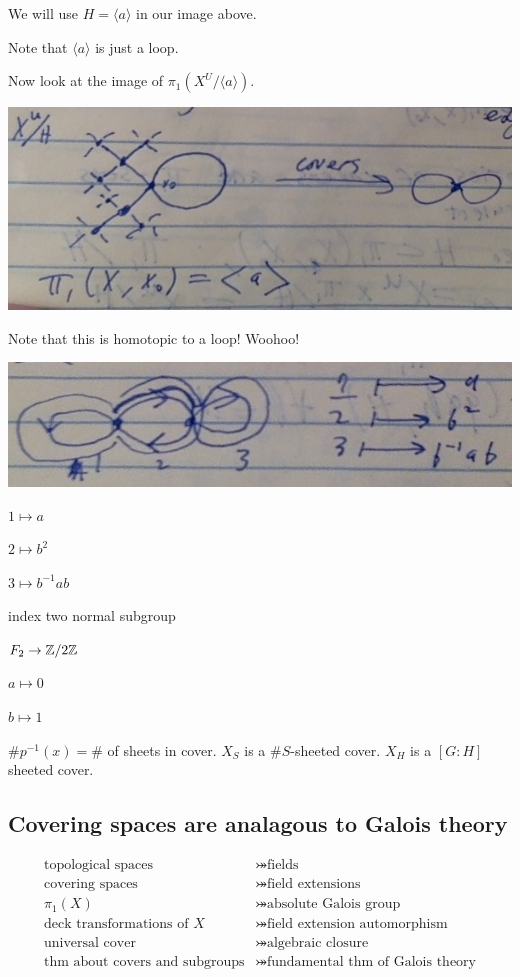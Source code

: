\documentclass[11pt,leqno,oneside]{amsart}
\numberwithin{thm}{section}
\newcommand{\fund}[1][1]{\pi_{#1}}
\begin{document}
\begin{example}
  We will use $H =  \langle a \rangle $ in our image above.

  Note that $ \langle a \rangle $ is just a loop.

  Now look at the image of $\fund(X^U/ \langle a \rangle )$.

  \includegraphics[scale=0.2]{images/loop-tree-cover}

  Note that this is homotopic to a loop!  Woohoo!
\end{example}
\begin{example}
  \includegraphics[scale=0.26]{images/loopy}

  $1 \mapsto a$

  $2 \mapsto b^2$

  $3 \mapsto b^{-1} a b$

  index two normal subgroup

  $F_2 \to {\mathbb Z}/2{\mathbb Z}$

  $a \mapsto 0$

  $b \mapsto 1$
\end{example}


$\#p^{-1}(x) = \#$ of sheets in cover.  $X_S$ is a $\#S$-sheeted cover.  $X_H$ is a $[G:H]$ sheeted cover.

\subsection{Covering spaces are analagous to Galois theory}
\begin{align}
  \text{topological spaces} &\bij \text{fields} \\
  \text{covering spaces} &\bij \text{field extensions} \\
  \fund(X) &\bij \text{absolute Galois group} \\
  \text{deck transformations of $X$} &\bij \text{field extension automorphism} \\
  \text{universal cover} &\bij \text{algebraic closure} \\
  \text{thm about covers and subgroups} &\bij \text{fundamental thm of Galois theory}
\end{align}
\end{document}
